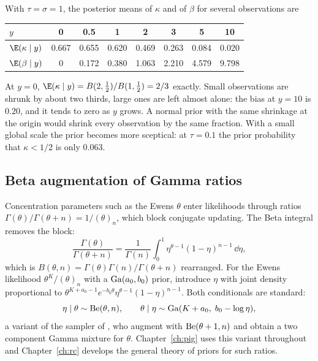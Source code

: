 \begin{example}\label{toolkit:ex:hs}
With $\tau=\sigma=1$, the posterior means of $\kappa$ and of $\beta$ for several observations are
\begin{center}\small
\begin{tabular}{lccccccc}
\toprule
$y$ & 0 & 0.5 & 1 & 2 & 3 & 5 & 10\\
\midrule
$\E(\kappa\mid y)$ & 0.667 & 0.655 & 0.620 & 0.469 & 0.263 & 0.084 & 0.020\\
$\E(\beta\mid y)$ & 0 & 0.172 & 0.380 & 1.063 & 2.210 & 4.579 & 9.798\\
\bottomrule
\end{tabular}
\end{center}
At $y=0$, $\E(\kappa\mid y)=B(2,\tfrac12)/B(1,\tfrac12)=2/3$ exactly. Small observations are
shrunk by about two thirds, large ones are left almost alone: the bias at $y=10$ is $0.20$, and it
tends to zero as $y$ grows. A normal prior with the same shrinkage at the origin would shrink
every observation by the same fraction. With a small global scale the prior becomes more
sceptical: at $\tau=0.1$ the prior probability that $\kappa<1/2$ is only $0.063$.
\end{example}

\subsection{Beta augmentation of Gamma ratios}\label{toolkit:sec:betaaug}

Concentration parameters such as the Ewens $\theta$ enter likelihoods through ratios
$\Gamma(\theta)/\Gamma(\theta+n)=1/(\theta)_n$, which block conjugate updating. The Beta integral
removes the block:
\begin{equation}\label{toolkit:eq:betaaug}
\frac{\Gamma(\theta)}{\Gamma(\theta+n)}=\frac{1}{\Gamma(n)}\int_0^1\eta^{\theta-1}(1-\eta)^{n-1}\,\dd\eta,
\end{equation}
which is $B(\theta,n)=\Gamma(\theta)\Gamma(n)/\Gamma(\theta+n)$ rearranged. For the Ewens likelihood
$\theta^{K}/(\theta)_n$ with a $\mathrm{Ga}(a_0,b_0)$ prior, introduce $\eta$ with joint density
proportional to $\theta^{K+a_0-1}e^{-b_0\theta}\eta^{\theta-1}(1-\eta)^{n-1}$. Both conditionals are
standard:
\begin{equation}\label{toolkit:eq:ewgibbs}
\eta\mid\theta\sim\mathrm{Be}(\theta,n),\qquad \theta\mid\eta\sim\mathrm{Ga}(K+a_0,\;b_0-\log\eta),
\end{equation}
a variant of the sampler of \citet{toolkit:escobar1995}, who augment with $\mathrm{Be}(\theta+1,n)$ and obtain a two component Gamma mixture for $\theta$. Chapter~\ref{ch:pig} uses this variant throughout and
Chapter~\ref{ch:rc} develops the general theory of priors for such ratios.

